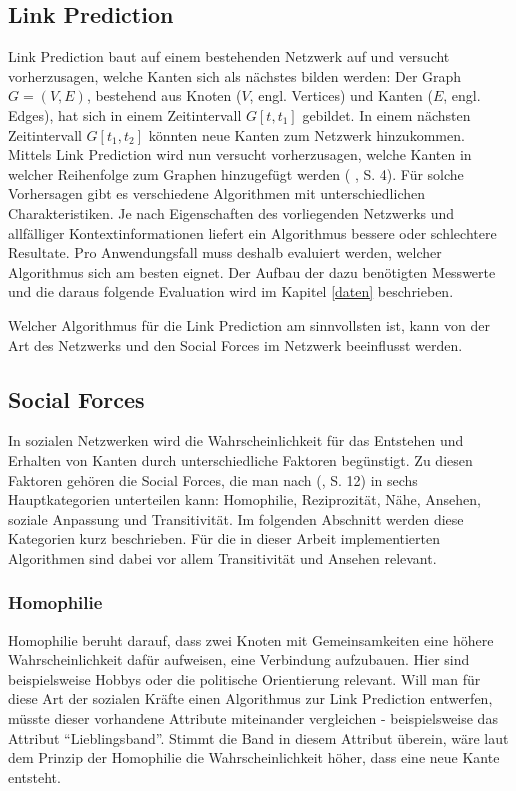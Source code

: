 \subsection{Link Prediction}
Link Prediction baut auf einem bestehenden Netzwerk auf und versucht vorherzusagen, welche Kanten sich als nächstes bilden werden:
Der Graph $G = (V, E)$, bestehend aus Knoten ($V$, engl. Vertices) und Kanten ($E$, engl. Edges), hat sich in einem Zeitintervall $G[t, t_1]$ gebildet.
In einem nächsten Zeitintervall $G[t_1, t_2]$ könnten neue Kanten zum Netzwerk hinzukommen.
Mittels Link Prediction wird nun versucht vorherzusagen, welche Kanten in welcher Reihenfolge zum Graphen hinzugefügt werden (\citeauthor{gao_link_2015} \citeyear{gao_link_2015}, S. 4).
Für solche Vorhersagen gibt es verschiedene Algorithmen mit unterschiedlichen Charakteristiken.
Je nach Eigenschaften des vorliegenden Netzwerks und allfälliger Kontextinformationen liefert ein Algorithmus bessere oder schlechtere Resultate.
Pro Anwendungsfall muss deshalb evaluiert werden, welcher Algorithmus sich am besten eignet.
Der Aufbau der dazu benötigten Messwerte und die daraus folgende Evaluation wird im Kapitel \ref{daten} beschrieben.

Welcher Algorithmus für die Link Prediction am sinnvollsten ist, kann von der Art des Netzwerks und den Social Forces im Netzwerk beeinflusst werden.

\subsection{Social Forces}
\label{socialforces}
In sozialen Netzwerken wird die Wahrscheinlichkeit für das Entstehen und Erhalten von Kanten durch unterschiedliche
Faktoren begünstigt. Zu diesen Faktoren gehören die Social Forces, die man nach \citeauthor{michael_henninger_soziale_2018} (\citeyear{michael_henninger_soziale_2018}, S. 12) in sechs Hauptkategorien unterteilen kann: Homophilie,
Reziprozität, Nähe, Ansehen, soziale Anpassung und Transitivität. Im folgenden Abschnitt werden diese Kategorien kurz
beschrieben. Für die in dieser Arbeit implementierten Algorithmen sind dabei vor allem Transitivität und Ansehen
relevant.

\subsubsection{Homophilie}
Homophilie beruht darauf, dass zwei Knoten mit Gemeinsamkeiten eine höhere Wahrscheinlichkeit dafür
aufweisen, eine Verbindung aufzubauen. Hier sind beispielsweise Hobbys oder die politische Orientierung relevant. Will
man für diese Art der sozialen Kräfte einen Algorithmus zur Link Prediction entwerfen, müsste dieser vorhandene
Attribute miteinander vergleichen - beispielsweise das Attribut ``Lieblingsband''. Stimmt die Band in diesem Attribut
überein, wäre laut dem Prinzip der Homophilie die Wahrscheinlichkeit höher, dass eine neue Kante entsteht.

